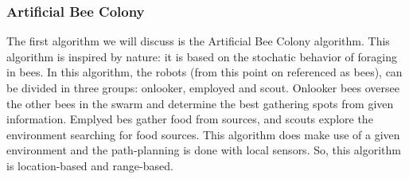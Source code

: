 \subsubsection{Artificial Bee Colony}
The first algorithm we will discuss is the Artificial Bee Colony algorithm. \cite{bhattacharjee2011multi}
This algorithm is inspired by nature: it is based on the stochatic behavior of foraging in bees.
In this algorithm, the robots (from this point on referenced as bees), can be divided in three groups: onlooker, employed and scout.
Onlooker bees oversee the other bees in the swarm and determine the best gathering spots from given information. 
Emplyed bes gather food from sources, and scouts explore the environment searching for food sources.
This algorithm does make use of a given environment and the path-planning is done with local sensors. 
So, this algorithm is location-based and range-based.

%

